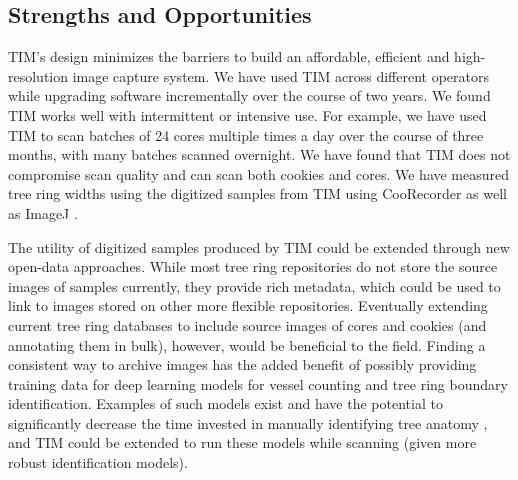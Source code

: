 \documentclass[a4paper,12pt]{article}
\newcommand{\R}[1]{\label{#1}\linelabel{#1}}
\begin{document}
\subsection{Strengths and Opportunities} 
TIM's design minimizes the barriers to build an affordable, efficient and high-resolution image capture system. \R{usage_2start}We have used TIM across different operators while upgrading software incrementally over the course of two years. We found TIM works well with intermittent or intensive use. For example, we have used TIM to scan batches of 24 cores multiple times a day over the course of three months, with many batches scanned overnight.\R{usage_2end}
We have found that TIM does not compromise scan quality and can scan both cookies and cores. We have measured tree ring widths using the digitized samples from TIM using CooRecorder as well as ImageJ \citep{schneider_nih_2012}.

The utility of digitized samples produced by TIM could be extended through new open-data approaches. 
While most tree ring repositories \citep[e.g.,the International Tree-Ring Data Bank or TreeSource's Tree-Rings Database for Canadian sites][]{grissino-mayer_international_1997,girardin_national_2021} do not store the source images of samples currently, they provide rich metadata, which could be used to link to images stored on other more flexible repositories. 
Eventually extending current tree ring databases to include source images of cores and cookies (and annotating them in bulk), however, would be beneficial to the field. Finding a consistent way to archive images has the added benefit of possibly providing training data for deep learning models for vessel counting and tree ring boundary identification. 
Examples of such models exist and have the potential to significantly decrease the time invested in manually identifying tree anatomy \citep{resente_mask_2021,polacek_automation_2023}, and TIM could be extended to run these models while scanning (given more robust identification models).
\end{document}
